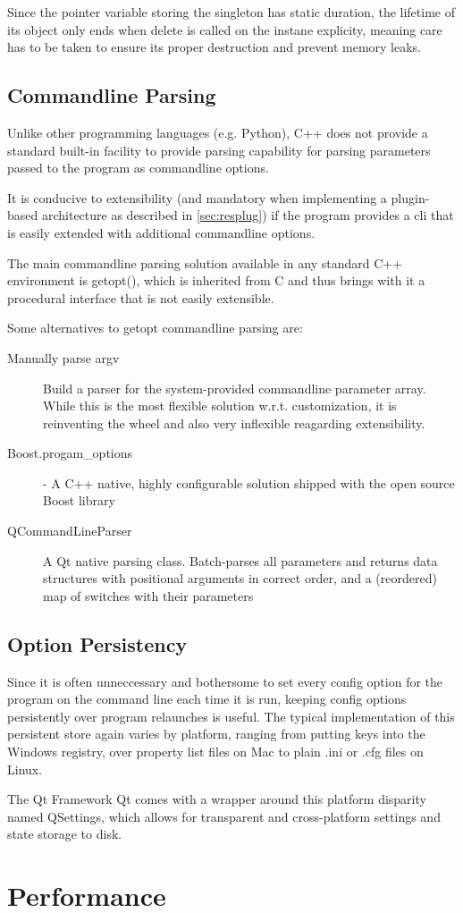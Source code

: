 Since the pointer variable storing the singleton has static duration, the lifetime of its object only ends when delete is called on the instane explicity, meaning care has to be taken to ensure its proper destruction and prevent memory leaks.

\subsection{Commandline Parsing}
Unlike other programming languages (e.g. Python), C++ does not provide a standard built-in facility to provide parsing capability for parsing parameters passed to the program as commandline options.

It is conducive to extensibility (and mandatory when implementing a plugin-based architecture as described in \ref{sec:resplug}) if the program provides a \gls{cli} that is easily extended with additional commandline options.

The main commandline parsing solution available in any standard C++ environment is getopt(), which is inherited from C and thus brings with it a procedural interface that is not easily extensible.

Some alternatives to getopt commandline parsing are:
\begin{description}
\item [Manually parse argv] Build a parser for the system-provided commandline parameter array. While this is the most flexible solution w.r.t. customization, it is reinventing the wheel and also very inflexible reagarding extensibility.
\item [Boost.progam\_options] - A C++ native, highly configurable solution shipped with the open source Boost library
\item [QCommandLineParser] A Qt native parsing class. Batch-parses all parameters and returns data structures with positional arguments in correct order, and a (reordered) map of switches with their parameters
\end{description}



\subsection{Option Persistency}
Since it is often unneccessary and bothersome to set every config option for the program on the command line each time it is run, keeping config options persistently over program relaunches is useful. The typical implementation of this persistent store again varies by platform, ranging from putting keys into the Windows registry, over property list files on Mac to plain .ini or .cfg files on Linux.

The Qt Framework Qt comes with a wrapper around this platform disparity named QSettings, which allows for transparent and cross-platform settings and state storage to disk.

\section{Performance}
